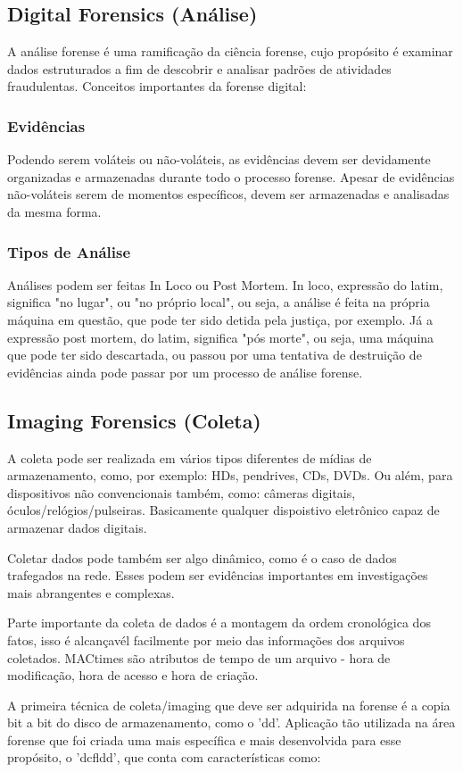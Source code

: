 \documentclass[journal]{IEEEtran}
\begin{document}
\subsection{Digital Forensics (Análise)}
A análise forense é uma ramificação da ciência forense, cujo propósito é examinar dados estruturados a fim de descobrir e analisar padrões de atividades fraudulentas.
Conceitos importantes da forense digital:
\subsubsection{Evidências}
Podendo serem voláteis ou não-voláteis, as evidências devem ser devidamente organizadas e armazenadas durante todo o processo forense. Apesar de evidências não-voláteis serem de momentos específicos, devem ser armazenadas e analisadas da mesma forma.
\subsubsection{Tipos de Análise}
Análises podem ser feitas In Loco ou Post Mortem. In loco, expressão do latim, significa "no lugar", ou "no próprio local", ou seja, a análise é feita na própria máquina em questão, que pode ter sido detida pela justiça, por exemplo. Já a expressão post mortem, do latim, significa "pós morte", ou seja, uma máquina que pode ter sido descartada, ou passou por uma tentativa de destruição de evidências ainda pode passar por um processo de análise forense.

\subsection{Imaging Forensics (Coleta)}
A coleta pode ser realizada em vários tipos diferentes de mídias de armazenamento, como, por exemplo: HDs, pendrives, CDs, DVDs. Ou além, para dispositivos não convencionais também, como: câmeras digitais, óculos/relógios/pulseiras. Basicamente qualquer dispoistivo eletrônico capaz de armazenar dados digitais. \par
Coletar dados pode também ser algo dinâmico, como é o caso de dados trafegados na rede. Esses podem ser evidências importantes em investigações mais abrangentes e complexas. \par
Parte importante da coleta de dados é a montagem da ordem cronológica dos fatos, isso é alcançavél facilmente por meio das informações dos arquivos coletados. MACtimes são atributos de tempo de um arquivo - hora de modificação, hora de acesso e hora de criação. \par
A primeira técnica de coleta/imaging que deve ser adquirida na forense é a copia bit a bit do disco de armazenamento, como o 'dd'. Aplicação tão utilizada na área forense que foi criada uma mais específica e mais desenvolvida para esse propósito, o 'dcfldd', que conta com características como:
\end{document}
